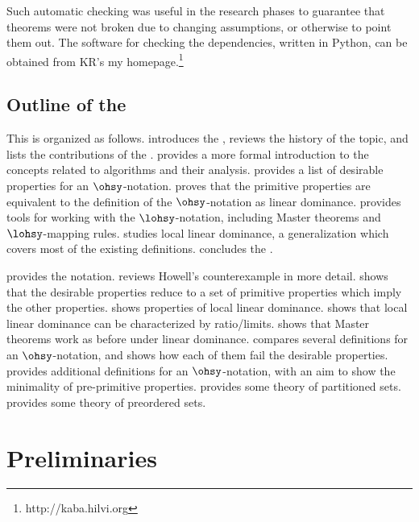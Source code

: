\documentclass[b5paper, english, oneside]{memoir}
\begin{document}
Such automatic checking was useful in the research phases to guarantee that theorems were not broken due to changing assumptions, or otherwise to point them out. The software for checking the dependencies, written in Python, can be obtained from 
\ifwe
KR's
\else
my
\fi
homepage.\footnote{http://kaba.hilvi.org}

\section{Outline of the \manuscript{}}

This \manuscript{} is organized as follows.  introduces the \manuscript{}, reviews the history of the topic, and lists the contributions of the \manuscript{}.  provides a more formal introduction to the concepts related to algorithms and their analysis.  provides a list of desirable properties for an $\ohsy$-notation.  proves that the primitive properties are equivalent to the definition of the $\ohsy$-notation as linear dominance.  provides tools for working with the $\lohsy$-notation, including Master theorems and $\lohsy$-mapping rules.  studies local linear dominance, a generalization which covers most of the existing definitions.  concludes the \manuscript{}.

 provides the notation.  reviews Howell's counterexample in more detail.  shows that the desirable properties reduce to a set of \nprim{} primitive properties which imply the other properties.  shows properties of local linear dominance.  shows that local linear dominance can be characterized by ratio\-/limits.  shows that Master theorems work as before under linear dominance.  compares several definitions for an $\ohsy$-notation, and shows how each of them fail the desirable properties.  provides additional definitions for an $\ohsy$-notation, with an aim to show the minimality of pre-primitive properties.  provides some theory of partitioned sets.  provides some theory of preordered sets.

\chapter{Preliminaries}
\label{Preliminaries}
\end{document}
